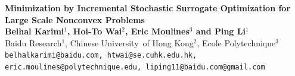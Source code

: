 \documentclass[a0,landscape]{a0poster}
\theoremstyle{definition}
\begin{document}

\begin{minipage}[b]{0.9\linewidth}
\veryHuge \color{Navy} \textbf{Minimization by Incremental Stochastic Surrogate Optimization for Large Scale Nonconvex Problems
}\\[1cm] \color{Black} %
\huge \textbf{Belhal Karimi$^{1}$, Hoi-To Wai$^{2}$, Eric Moulines$^{3}$ and Ping Li$^{1}$}\\[0.5cm] %
\huge Baidu Research$^1$, Chinese University~of Hong Kong$^2$, Ecole Polytechnique$^3$ \\[0.4cm] %
\large \texttt{belhalkarimi@baidu.com, htwai@se.cuhk.edu.hk, eric.moulines@polytechnique.edu, liping11@baidu.com@gmail.com}
\end{minipage}
%


\vspace{1cm} %

\end{document}
